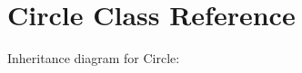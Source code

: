 \hypertarget{classCircle}{}\section{Circle Class Reference}
\label{classCircle}


Inheritance diagram for Circle\+:
